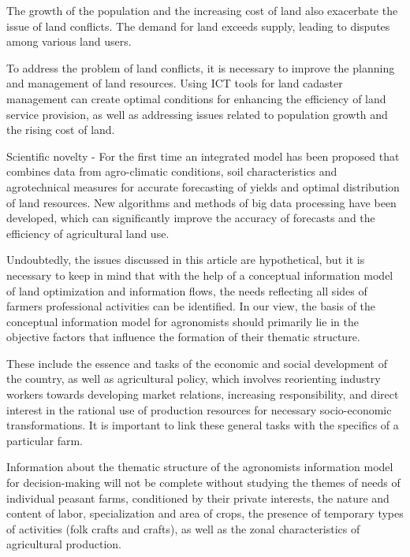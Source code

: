 The growth of the population and the increasing cost of land also
exacerbate the issue of land conflicts. The demand for land exceeds
supply, leading to disputes among various land users.

To address the problem of land conflicts, it is necessary to improve the
planning and management of land resources. Using ICT tools for land
cadaster management can create optimal conditions for enhancing the
efficiency of land service provision, as well as addressing issues
related to population growth and the rising cost of land.

Scientific novelty - For the first time an integrated model has been
proposed that combines data from agro-climatic conditions, soil
characteristics and agrotechnical measures for accurate forecasting of
yields and optimal distribution of land resources. New algorithms and
methods of big data processing have been developed, which can
significantly improve the accuracy of forecasts and the efficiency of
agricultural land use.

Undoubtedly, the issues discussed in this article are hypothetical, but
it is necessary to keep in mind that with the help of a conceptual
information model of land optimization and information flows, the needs
reflecting all sides of farmers\textquotesingle{} professional
activities can be identified. In our view, the basis of the conceptual
information model for agronomists should primarily lie in the objective
factors that influence the formation of their thematic structure.

These include the essence and tasks of the economic and social
development of the country, as well as agricultural policy, which
involves reorienting industry workers towards developing market
relations, increasing responsibility, and direct interest in the
rational use of production resources for necessary socio-economic
transformations. It is important to link these general tasks with the
specifics of a particular farm.

Information about the thematic structure of the
agronomists\textquotesingle{} information model for decision-making will
not be complete without studying the themes of needs of individual
peasant farms, conditioned by their private interests, the nature and
content of labor, specialization and area of crops, the presence of
temporary types of activities (folk crafts and crafts), as well as the
zonal characteristics of agricultural production.

